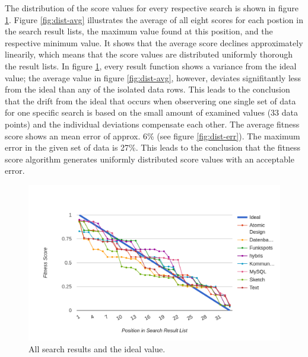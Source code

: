 The distribution of the score values for every respective search is shown in figure \ref{fig:dist-raw}.
Figure \ref{fig:dist-avg} illustrates the average of all eight scores for each postion in the search result lists, the maximum value found at this position, and the respective minimum value.
It shows that the average score declines approximately linearily, which means that the score values are distributed uniformly thorough the result lists. In figure \ref{fig:dist-raw}, every result function shows a variance from the ideal value; the average value in figure \ref{fig:dist-avg}, however, deviates signifitantly less from the ideal than any of the isolated data rows. This leads to the conclusion that the drift from the ideal that occurs when observering one single set of data for one specific search is based on the small amount of examined values (33 data points) and the individual deviations compensate each other. The average fitness score shows an mean error of approx. 6\% (see figure \ref{fig:dist-err}). The maximum error in the given set of data is 27\%.
This leads to the conclusion that the fitness score algorithm generates uniformly distributed score values with an acceptable error.\\

\begin{figure}[H]
    \centering
    \includegraphics[width=\textwidth]{images/dist_raw.png}
    \caption[Diagram: Fitness Score Distribution (Raw)]{All search results and the ideal value.}
    \label{fig:dist-raw}
\end{figure}

